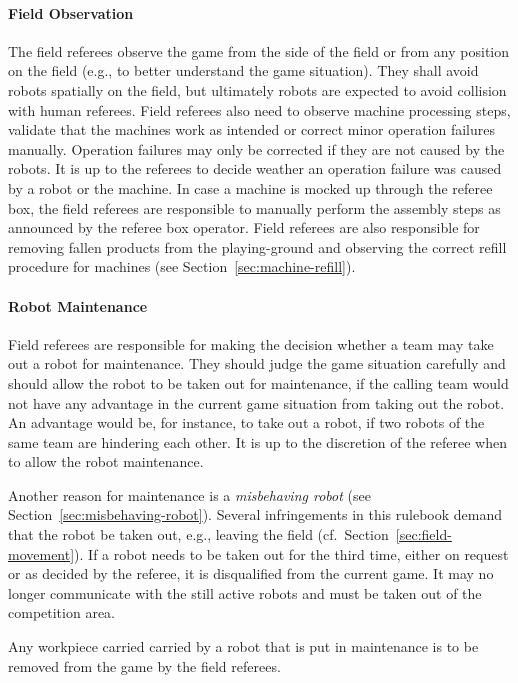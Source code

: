 \documentclass[12pt,twoside]{article}
\newcommand{\refsec}[1]{Section~\ref{#1}}
\begin{document}
\paragraph{Field Observation}
The field referees observe the game from the side of the field or from
any position on the field (e.g., to better understand the game
situation). They shall avoid robots spatially on the field, but
ultimately robots are expected to avoid collision with human
referees.
Field referees also need to observe machine processing steps, validate that
the machines work as intended or correct minor operation failures manually.
Operation failures may only be corrected if they are not caused by the robots.
It is up to the referees to decide weather an operation failure was caused by
a robot or the machine.
In case a machine is mocked up through the referee box, the field referees
are responsible to manually perform the assembly steps as announced by the
referee box operator.
Field referees are also responsible for removing fallen
products from the playing-ground and observing the correct refill procedure
for machines (see \refsec{sec:machine-refill}).

\paragraph{Robot Maintenance}
Field referees are responsible for
making the decision whether a team may take out a robot for
maintenance.
They should judge the game situation carefully and should allow the
robot to be taken out for maintenance, if the calling team would not
have any advantage in the current game situation from taking out the
robot. An advantage would be, for instance, to take out a robot, if
two robots of the same team are hindering each other. It is up to the
discretion of the referee when to allow the robot maintenance.

Another reason for maintenance is a \emph{misbehaving robot}
(see \refsec{sec:misbehaving-robot}).
Several
infringements in this rulebook demand that the robot be taken out,
e.g., leaving the field (cf.~\refsec{sec:field-movement}).
If a robot needs to be taken out for the third time, either on
request or as decided by the referee, it is disqualified from the
current game. It may no longer communicate with the still active
robots and must be taken out of the competition area.

Any workpiece carried carried by a robot that is put in maintenance is to
be removed from the game by the field referees.
\end{document}
